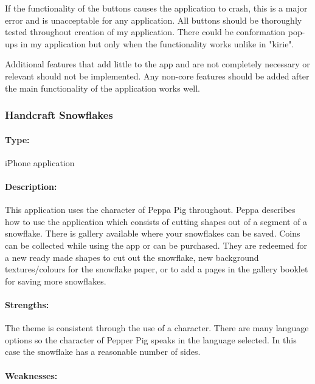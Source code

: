 \documentclass[11pt]{article}
\begin{document}
                If the functionality of the buttons causes the application to crash, this is a major error and is unacceptable for any application. All buttons should be thoroughly tested throughout creation of my application. There could be conformation pop-ups in my application but only when the functionality works unlike in "kirie". 
                
                Additional features that add little to the app and are not completely necessary or relevant should not be implemented. Any non-core features should be added after the main functionality of the application works well.
                
                 \subsubsection{Handcraft Snowflakes}
            
                \paragraph{Type:} iPhone application 

                \paragraph{Description:}
                This application uses the character of Peppa Pig throughout. Peppa describes how to use the application which consists of cutting shapes out of a segment of a snowflake. There is gallery available where your snowflakes can be saved. Coins can be collected while using the app or can be purchased. They are redeemed for a new ready made shapes to cut out the snowflake, new background textures/colours for the snowflake paper, or to add a pages in the gallery booklet for saving more snowflakes. 

                \paragraph{Strengths:}
                The theme is consistent through the use of a character.
                There are many language options so the character of Pepper Pig speaks in the language selected.
                In this case the snowflake has a reasonable number of sides. 

                \paragraph{Weaknesses:}
                
\end{document}
